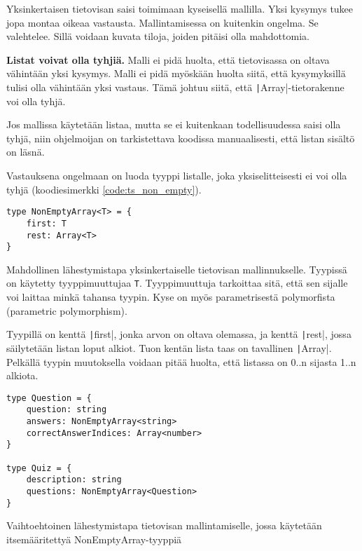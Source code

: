 Yksinkertaisen tietovisan saisi toimimaan kyseisellä mallilla. Yksi kysymys tukee jopa montaa oikeaa vastausta.
Mallintamisessa on kuitenkin ongelma. Se valehtelee. Sillä voidaan kuvata tiloja, joiden pitäisi olla mahdottomia.

\textbf{Listat voivat olla tyhjiä.} Malli ei pidä huolta, että tietovisassa on oltava vähintään yksi kysymys. Malli ei pidä myöskään huolta siitä, että kysymyksillä tulisi olla vähintään yksi vastaus. Tämä johtuu siitä, että \texttt|Array|-tietorakenne voi olla tyhjä.

Jos mallissa käytetään listaa, mutta se ei kuitenkaan todellisuudessa saisi olla tyhjä, niin ohjelmoijan on tarkistettava koodissa manuaalisesti, että listan sisältö on läsnä.

Vastauksena ongelmaan on luoda tyyppi listalle, joka yksiselitteisesti ei voi olla tyhjä (koodiesimerkki \ref{code:ts_non_empty}).

\begin{code}
    \begin{verbatim}
type NonEmptyArray<T> = {
    first: T
    rest: Array<T>
}
    \end{verbatim}
    \caption{Mahdollinen lähestymistapa yksinkertaiselle tietovisan mallinnukselle. Tyypissä on käytetty tyyppimuuttujaa \texttt{T}. Tyyppimuuttuja tarkoittaa sitä, että sen sijalle voi laittaa minkä tahansa tyypin. Kyse on myös parametrisestä polymorfista (parametric polymorphism).}
    \label{code:ts_non_empty}
\end{code}

Tyypillä on kenttä \texttt|first|, jonka arvon on oltava olemassa, ja kenttä \texttt|rest|, jossa säilytetään listan loput alkiot. Tuon kentän lista taas on tavallinen \texttt|Array|. Pelkällä tyypin muutoksella voidaan pitää huolta, että listassa on 0..n sijasta 1..n alkiota.

\begin{code}
    \begin{verbatim}
type Question = {
    question: string
    answers: NonEmptyArray<string> 
    correctAnswerIndices: Array<number>
}

type Quiz = {
    description: string
    questions: NonEmptyArray<Question> 
}       
    \end{verbatim}
    \caption{Vaihtoehtoinen lähestymistapa tietovisan mallintamiselle, jossa käytetään itsemääritettyä NonEmptyArray-tyyppiä}
    \label{code:ts_non_empty_quiz}
\end{code}

